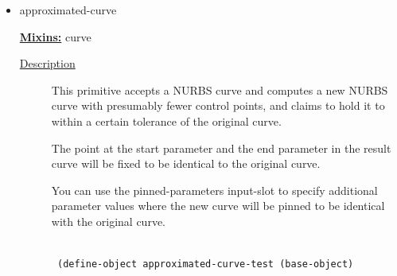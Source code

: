 \documentclass [11pt]{book}
\begin{document}
\begin{itemize}

\item {}approximated-curve


\textbf{
\underline{Mixins:}} curve





\begin{description}

\item [
\underline{Description}]


This primitive accepts a NURBS curve and 
computes a new NURBS curve with presumably fewer control points, and claims
to hold it to within a certain tolerance of the original curve. 

The point at the start parameter and the end parameter in the result 
curve will be fixed to be identical to the original curve. 

You can use the pinned-parameters input-slot to specify additional parameter
values where the new curve will be pinned to be identical with the original curve.



\end{description}




\begin{figure}
\begin{lrbox}{\boxedverb}
\begin{minipage}{\linewidth}
{\small

\begin{verbatim}

 (define-object approximated-curve-test (base-object)
  

\end{verbatim}}
\end{minipage}
\end{lrbox}
\end{figure}
\end{itemize}
\end{document}
